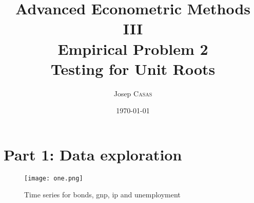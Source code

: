 \documentclass{article}
\title{\Large
Advanced Econometric Methods III\\
Empirical Problem 2\\
Testing for Unit Roots
} %
\author{Josep \textsc{Casas}} %
\date{\today} %
\begin{document}
\maketitle

\section{Part 1: Data exploration} 


\begin{figure}[h!]
\texttt{[image: one.png]}
\caption{Time series for bonds, gnp, ip and unemployment}
\end{figure}
\end{document}
